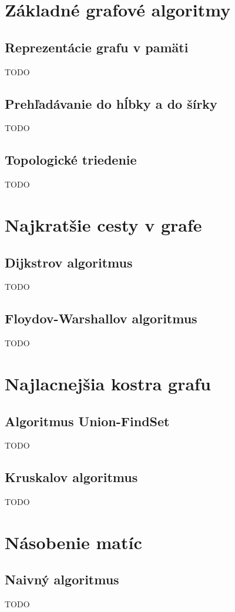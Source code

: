 \section{Základné grafové algoritmy}

	\subsection{Reprezentácie grafu v pamäti} TODO
	\subsection{Prehľadávanie do hĺbky a do šírky} TODO
	\subsection{Topologické triedenie} TODO

\section{Najkratšie cesty v grafe}

	\subsection{Dijkstrov algoritmus} TODO
	\subsection{Floydov-Warshallov algoritmus} TODO

\section{Najlacnejšia kostra grafu}

	\subsection{Algoritmus Union-FindSet} TODO
	\subsection{Kruskalov algoritmus} TODO

\section{Násobenie matíc}

	\subsection{Naivný algoritmus} TODO
